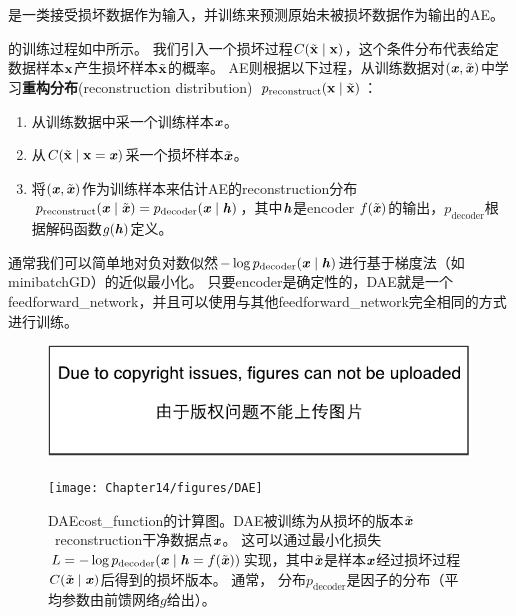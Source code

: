 \section{}
\label{sec:denoising_autoencoders}
是一类接受损坏数据作为输入，并训练来预测原始未被损坏数据作为输出的\gls{AE}。


的训练过程如中所示。
我们引入一个损坏过程$C(\tilde{\mathbf{x}} \mid \mathbf{x})$，这个条件分布代表给定数据样本$\mathbf{x}$产生损坏样本$\tilde {\mathbf{x}}$的概率。
\gls{AE}则根据以下过程，从训练数据对$(\boldsymbol{\mathit{x}}, \tilde {\boldsymbol{\mathit{x}}})$中学习\textbf{重构分布}(reconstruction distribution)~$p_{\text{reconstruct}} (\mathbf{x} \mid \tilde {\mathbf{x}})$：
\begin{enumerate}
\item 从训练数据中采一个训练样本$\boldsymbol{\mathit{x}}$。
\item 从$C(\tilde{\mathbf{x}} \mid \mathbf{x}=\boldsymbol{\mathit{x}})$采一个损坏样本$\tilde {\boldsymbol{\mathit{x}}}$。
\item 将$(\boldsymbol{\mathit{x}}, \tilde {\boldsymbol{\mathit{x}}})$作为训练样本来估计\gls{AE}的\gls{reconstruction}分布 
$p_{\text{reconstruct}} (\boldsymbol{\mathit{x}} \mid \tilde {\boldsymbol{\mathit{x}}}) = p_{\text{decoder}}(\boldsymbol{\mathit{x}} \mid\boldsymbol{\mathit{h}})$，其中$\boldsymbol{\mathit{h}}$是\gls{encoder} $f(\tilde {\boldsymbol{\mathit{x}}})$的输出，$p_{\text{decoder}}$根据解码函数$g(\boldsymbol{\mathit{h}})$定义。
\end{enumerate}
通常我们可以简单地对负对数似然$-\log p_{\text{decoder}} (\boldsymbol{\mathit{x}} \mid \boldsymbol{\mathit{h}})$进行基于梯度法（如\gls{minibatch}\gls{GD}）的近似最小化。
只要\gls{encoder}是确定性的，\gls{DAE}就是一个\gls{feedforward_network}，并且可以使用与其他\gls{feedforward_network}完全相同的方式进行训练。

\begin{figure}[!htb]
\ifOpenSource
\centerline{\includegraphics{figure.pdf}}
\else
\centerline{\texttt{[image: Chapter14/figures/DAE]}}
\fi
\caption{\gls{DAE}\gls{cost_function}的计算图。\gls{DAE}被训练为从损坏的版本$\tilde {\boldsymbol{\mathit{x}}}$~\gls{reconstruction}干净数据点$\boldsymbol{\mathit{x}}$。
这可以通过最小化损失$L = - \log p_{\text{decoder}} (\boldsymbol{\mathit{x}} \mid \boldsymbol{\mathit{h}} = f(\tilde {\boldsymbol{\mathit{x}}}))$实现，其中$\tilde {\boldsymbol{\mathit{x}}}$是样本$\boldsymbol{\mathit{x}}$经过损坏过程$C (\tilde {\boldsymbol{\mathit{x}}} \mid \boldsymbol{\mathit{x}})$后得到的损坏版本。
通常， 分布$p_{\text{decoder}}$是因子的分布（平均参数由前馈网络$g$给出）。
}
\label{fig:chap14_DAE}
\end{figure}

